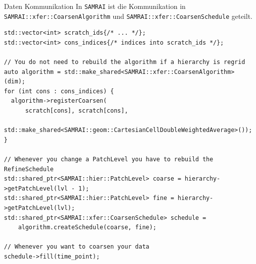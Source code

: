 \documentclass[ucs,9pt]{beamer}
\begin{document}
\begin{frame}[fragile]{Daten Kommunikation}
In \texttt{SAMRAI} ist die Kommunikation in \texttt{SAMRAI::xfer::CoarsenAlgorithm} und \texttt{SAMRAI::xfer::CoarsenSchedule} geteilt.
\begin{lstlisting}
std::vector<int> scratch_ids{/* ... */};
std::vector<int> cons_indices{/* indices into scratch_ids */};

// You do not need to rebuild the algorithm if a hierarchy is regrid
auto algorithm = std::make_shared<SAMRAI::xfer::CoarsenAlgorithm>(dim);
for (int cons : cons_indices) {
  algorithm->registerCoarsen(
      scratch[cons], scratch[cons],
      std::make_shared<SAMRAI::geom::CartesianCellDoubleWeightedAverage>());
}

// Whenever you change a PatchLevel you have to rebuild the RefineSchedule
std::shared_ptr<SAMRAI::hier::PatchLevel> coarse = hierarchy->getPatchLevel(lvl - 1);
std::shared_ptr<SAMRAI::hier::PatchLevel> fine = hierarchy->getPatchLevel(lvl);
std::shared_ptr<SAMRAI::xfer::CoarsenSchedule> schedule = 
    algorithm.createSchedule(coarse, fine);

// Whenever you want to coarsen your data
schedule->fill(time_point);
\end{lstlisting}
\end{frame}
\end{document}
